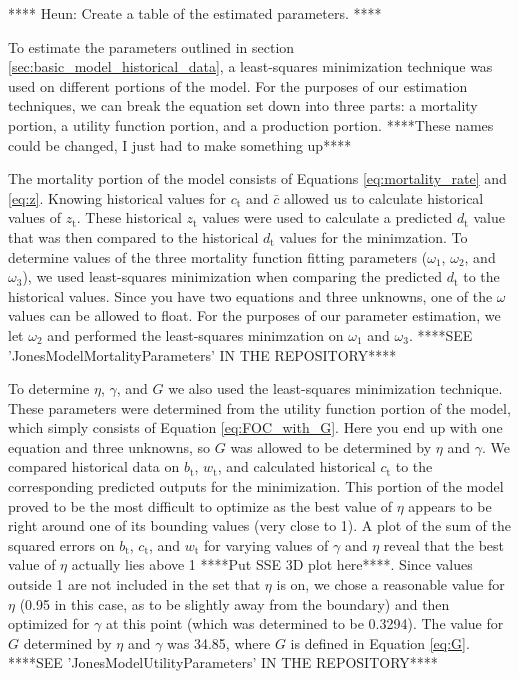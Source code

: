 \documentclass[letterpaper,12pt]{article}
\begin{document}
**** Heun: Create a table of the estimated parameters. ****

To estimate the parameters outlined in section \ref{sec:basic_model_historical_data}, a least-squares minimization technique was used on different portions of the model. For the purposes of our estimation techniques, we can break the equation set down into three parts: a mortality portion, a utility function portion, and a production portion. ****These names could be changed, I just had to make something up****

The mortality portion of the model consists of Equations \ref{eq:mortality_rate} and \ref{eq:z}. Knowing historical values for $c_\mathrm{t}$ and $\bar c$ allowed us to calculate historical values of $z_\mathrm{t}$. These historical $z_\mathrm{t}$ values were used to calculate a predicted $d_\mathrm{t}$ value that was then compared to the historical $d_\mathrm{t}$ values for the minimzation. To determine values of the three mortality function fitting parameters ($\omega_\mathrm{1}$, $\omega_\mathrm{2}$, and $\omega_\mathrm{3}$), we used least-squares minimization when comparing the predicted $d_\mathrm{t}$ to the historical values. Since you have two equations and three unknowns, one of the $\omega$ values can be allowed to float. For the purposes of our parameter estimation, we let $\omega_\mathrm{2}$ and performed the least-squares minimzation on $\omega_\mathrm{1}$ and $\omega_\mathrm{3}$.
****SEE 'JonesModelMortalityParameters' IN THE REPOSITORY****

To determine $\eta$, $\gamma$, and $G$ we also used the least-squares minimization technique. These parameters were determined from the utility function portion of the model, which simply consists of Equation \ref{eq:FOC_with_G}. Here you end up with one equation and three unknowns, so $G$ was allowed to be determined by $\eta$ and $\gamma$. We compared historical data on $b_\mathrm{t}$, $w_\mathrm{t}$, and calculated historical $c_\mathrm{t}$ to the corresponding predicted outputs for the minimization. This portion of the model proved to be the most difficult to optimize as the best value of $\eta$ appears to be right around one of its bounding values (very close to 1). A plot of the sum of the squared errors on $b_\mathrm{t}$, $c_\mathrm{t}$, and $w_\mathrm{t}$ for varying values of $\gamma$ and $\eta$ reveal that the best value of $\eta$ actually lies above 1 ****Put SSE 3D plot here****. Since values outside 1 are not included in the set that $\eta$ is on, we chose a reasonable value for $\eta$ (0.95 in this case, as to be slightly away from the boundary) and then optimized for $\gamma$ at this point (which was determined to be 0.3294). The value for $G$ determined by $\eta$ and $\gamma$ was 34.85, where $G$ is defined in Equation \ref{eq:G}.
****SEE 'JonesModelUtilityParameters' IN THE REPOSITORY****
\end{document}
